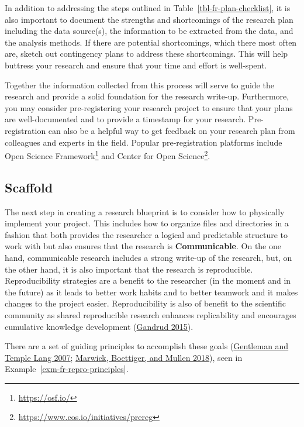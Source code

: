 \documentclass[
  letterpaper,
  DIV=11,
  numbers=noendperiod]{scrreport}
\theoremstyle{definition}
\theoremstyle{remark}
\DeclareRobustCommand{\href}[2]{#2\footnote{\url{#1}}}
\begin{document}
In addition to addressing the steps outlined in
Table~\ref{tbl-fr-plan-checklist}, it is also important to document the
strengths and shortcomings of the research plan including the data
source(s), the information to be extracted from the data, and the
analysis methods. If there are potential shortcomings, which there most
often are, sketch out contingency plans to address these shortcomings.
This will help buttress your research and ensure that your time and
effort is well-spent.

Together the information collected from this process will serve to guide
the research and provide a solid foundation for the research write-up.
Furthermore, you may consider pre-registering your research project to
ensure that your plans are well-documented and to provide a timestamp
for your research. Pre-registration can also be a helpful way to get
feedback on your research plan from colleagues and experts in the field.
Popular pre-registration platforms include \href{https://osf.io/}{Open
Science Framework} and
\href{https://www.cos.io/initiatives/prereg}{Center for Open Science}.

\hypertarget{sec-fr-scaffold}{%
\subsection{Scaffold}\label{sec-fr-scaffold}}

The next step in creating a research blueprint is to consider how to
physically implement your project. This includes how to organize files
and directories in a fashion that both provides the researcher a logical
and predictable structure to work with but also ensures that the
research is \textbf{Communicable}. On the one hand, communicable
research includes a strong write-up of the research, but, on the other
hand, it is also important that the research is reproducible.
Reproducibility strategies are a benefit to the researcher (in the
moment and in the future) as it leads to better work habits and to
better teamwork and it makes changes to the project easier.
Reproducibility is also of benefit to the scientific community as shared
reproducible research enhances replicability and encourages cumulative
knowledge development (\protect\hyperlink{ref-Gandrud2015}{Gandrud
2015}).

There are a set of guiding principles to accomplish these goals
(\protect\hyperlink{ref-Gentleman2007}{Gentleman and Temple Lang 2007};
\protect\hyperlink{ref-Marwick2018}{Marwick, Boettiger, and Mullen
2018}), seen in Example~\ref{exm-fr-repro-principles}.
\end{document}
